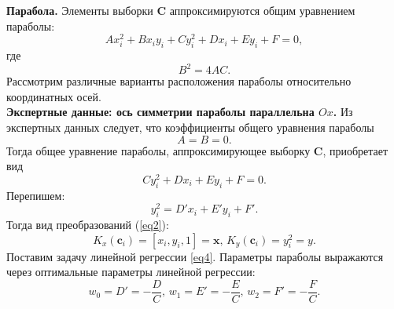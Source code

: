 \documentclass[12pt,twoside]{article}
\begin{document}
\textbf{Парабола.} Элементы выборки $\mathbf{C}$ аппроксимируются общим уравнением параболы: \begin{equation} Ax_i^2 + Bx_iy_i + Cy_i^2 + Dx_i + Ey_i + F = 0,\end{equation} где \begin{equation}\label{24}
B^2 = 4AC.\end{equation} Рассмотрим различные варианты расположения параболы относительно координатных осей. \\
\textbf{Экспертные данные: ось симметрии параболы параллельна $Ox$.} 
Из экспертных данных следует, что коэффициенты общего уравнения параболы \begin{equation}\label{25}
A = B = 0.\end{equation}
Тогда общее уравнение параболы, аппроксимирующее выборку $\mathbf{C}$, приобретает вид \begin{equation}Cy_i^2 + Dx_i + Ey_i + F = 0 .\end{equation}
Перепишем: \begin{equation}y_i^2 = D'x_i + E'y_i + F'.\end{equation}
Тогда вид преобразований (\ref{eq2}): \begin{equation}K_{x}(\mathbf{c}_i) = [x_i, y_i, 1] = \mathbf{x}, \,  K_{y}(\mathbf{c}_i) = y_i^2 = y. \end{equation} 
Поставим задачу линейной регрессии \eqref{eq4}.
Параметры параболы выражаются через оптимальные параметры линейной регрессии: \begin{equation} w_0 = D' = -\frac{D}{C}, \,  w_1 = E' = -\frac{E}{C}, \,  w_2 = F' = -\frac{F}{C}.\end{equation}
\end{document}
